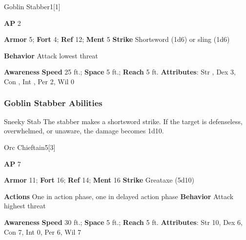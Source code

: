 \begin{monsection}{Goblin Stabber}{1}[1]
\vspace{-1em}\vspace{-1em}
\begin{spellcontent}
\begin{spelltargetinginfo}
{\textbf{AP} 2}

\pari \textbf{Armor} 5;
\textbf{Fort} 4;
\textbf{Ref} 12;
\textbf{Ment} 5
\pari \textbf{Strike} Shortsword  (1d6) or sling  (1d6)



\pari \textbf{Behavior} Attack lowest threat
\end{spelltargetinginfo}
\end{spellcontent}

\begin{monsterfooter}
\pari \textbf{Awareness} 
\pari \textbf{Speed} 25 ft.;
\textbf{Space} 5 ft.;
\textbf{Reach} 5 ft.
\pari \textbf{Attributes}:
Str ,
Dex 3,
Con ,
Int ,
Per 2,
Wil 0
\end{monsterfooter}
\end{monsection}


\subsubsection{Goblin Stabber Abilities}

\begin{freeability}{Sneeky Stab}
The stabber makes a shortsword strike.
If the target is defenseless, overwhelmed, or unaware, the damage becomes 1d10.
\end{freeability}

\begin{monsection}{Orc Chieftain}{5}[3]
\vspace{-1em}\vspace{-1em}
\begin{spellcontent}
\begin{spelltargetinginfo}
{\textbf{AP} 7}

\pari \textbf{Armor} 11;
\textbf{Fort} 16;
\textbf{Ref} 14;
\textbf{Ment} 16
\pari \textbf{Strike} Greataxe  (5d10)


\pari \textbf{Actions} One in action phase, one in delayed action phase
\pari \textbf{Behavior} Attack highest threat
\end{spelltargetinginfo}
\end{spellcontent}

\begin{monsterfooter}
\pari \textbf{Awareness} 
\pari \textbf{Speed} 30 ft.;
\textbf{Space} 5 ft.;
\textbf{Reach} 5 ft.
\pari \textbf{Attributes}:
Str 10,
Dex 6,
Con 7,
Int 0,
Per 6,
Wil 7
\end{monsterfooter}
\end{monsection}


